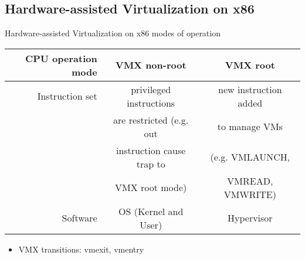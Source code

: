 \documentclass[10pt,hyperref={hyperfootnotes=false}, xcolor={usenames, dvipsnames}]{beamer}
\begin{document}

\subsection{Hardware-assisted Virtualization on x86}
\begin{frame}{Hardware-assisted Virtualization on x86} {modes of operation}
		\begin{table}[H]
		\centering
		\begin{longtable}{|r|c|c|} 
		\hline
			\textbf{CPU operation mode}	&	{\textbf{VMX non-root}} 	&	{\textbf{VMX root}} \\ \hline \hline
			Instruction set		&	privileged instructions 		&  new instruction added \\
				                &	are restricted (e.g. out	&  to manage VMs \\ 
				                &	instruction cause trap to   & (e.g. VMLAUNCH,  \\ 
				                &	VMX root mode)              & VMREAD, VMWRITE) \\ \hline
			Software 			&	OS (Kernel and User)	&	Hypervisor \\ \hline
		\end{longtable}
		\end{table}

		\begin{itemize}
			\item {VMX transitions: vmexit, vmentry}
		\end{itemize}
\end{frame}
\end{document}
